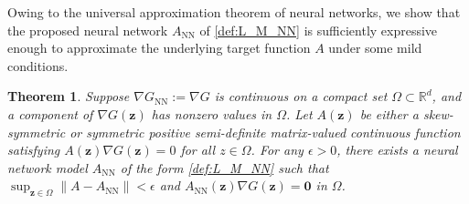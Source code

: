 \documentclass[openacc]{rsproca_new}%
\newcommand{\z}{\bm{z}}
\newtheorem{theorem}{Theorem}
\begin{document}
Owing to the universal approximation theorem 
\cite{Cybenko_MoC89,Mhaskar_Neurl96}
of neural networks,
we show that 
the proposed neural network $A_{\text{NN}}$ of \eqref{def:L_M_NN} 
is sufficiently expressive enough to approximate the underlying target function $A$
under some mild conditions.

\begin{theorem}
    Suppose $\nabla G_{\text{NN}} := \nabla G$ is continuous on a compact set $\Omega \subset \mathbb{R}^d$,
    and a component of $\nabla G(\z)$ has nonzero values in $\Omega$.
    Let $A(\z)$ be
    either a skew-symmetric or symmetric positive semi-definite matrix-valued continuous function satisfying
    $A(\z)\nabla G(\z) = 0$ 
    for all $z \in \Omega$.
    For any $\epsilon > 0$, 
    there exists a neural network model $A_{\text{NN}}$ 
    of the form \eqref{def:L_M_NN}
    such that 
    $\sup_{\z \in \Omega} \|A - A_{\text{NN}}\| < \epsilon$
    and $A_{\text{NN}}(\z)\nabla G(\z) = \bm{0}$ in $\Omega$.
\end{theorem}
\end{document}
